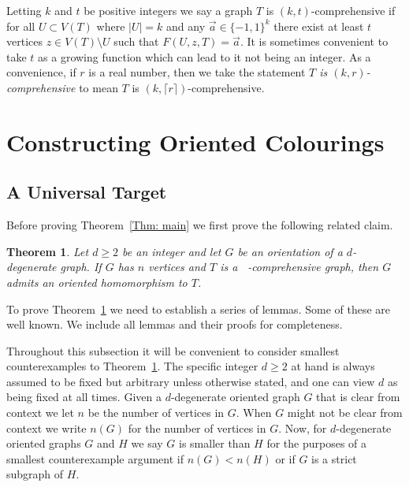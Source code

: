 \documentclass[11pt]{article}
\newtheorem{theorem}{Theorem}[section]
\theoremstyle{definition}
\DeclareMathOperator{\coe}{6\Big(1+\frac{9d^2}{4}\Big)^{\frac{1}{2}}d}
\DeclareMathOperator{\bound}{\Big( 3d-1, \coe\sqrt{n}\Big)}
\begin{document}
Letting $k$ and $t$ be positive integers
we say a graph $T$ is $(k,t)$-comprehensive if for all $U \subset V(T)$ where $|U| = k$ and any ${\vec a} \in \{-1,1\}^k$ there exist at least $t$ vertices $z \in V(T)\setminus U$ such that $F(U,z,T) = {\vec a}$.
It is sometimes convenient to take $t$ as a growing function which can lead to it 
not being an integer.
As a convenience, if $r$ is a real number, then we take 
the statement \emph{$T$ is $(k,r)$-comprehensive} to mean $T$ is $(k,\lceil r\rceil)$-comprehensive.



\section{Constructing Oriented Colourings}
\label{sec: Upper}

\subsection{A Universal Target}

Before proving Theorem~\ref{Thm: main}
we first prove the following related claim.



\begin{theorem}\label{Thm: Critical Upper}
    Let $d\geq 2$ be an integer and let $G$ be an orientation of a $d$-degenerate graph.
    If $G$ has $n$ vertices
    and $T$ is a $\bound$-comprehensive graph, then $G$ admits an oriented homomorphism to $T$.
\end{theorem}

To prove Theorem~\ref{Thm: Critical Upper} we need to establish a series of lemmas.
Some of these are well known.
We include all lemmas and their proofs for completeness.


Throughout this subsection it will be convenient 
to consider smallest counterexamples to Theorem~\ref{Thm: Critical Upper}.
The specific integer $d\geq 2$ at hand is always assumed to be fixed but arbitrary unless otherwise stated,
and one can view $d$ as being fixed at all times.
Given a $d$-degenerate oriented graph $G$ that is clear from context
we let $n$ be the number of vertices in $G$.
When $G$ might not be clear from context we write $n(G)$ for the number of vertices in $G$.
Now, for $d$-degenerate oriented graphs $G$ and $H$ we say $G$ is smaller than $H$ for the purposes of a 
smallest counterexample argument if $n(G) < n(H)$ or if $G$ is a strict subgraph of $H$.
\end{document}
